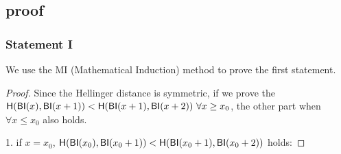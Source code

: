 \subsection{proof}

\subsubsection{Statement I}
We use the MI (Mathematical Induction) method to prove the first statement.

\begin{proof}
Since the Hellinger distance is symmetric, if we prove the $\mathsf{H} (\mathsf{BI}(x), \mathsf{BI}(x + 1)) < \mathsf{H} (\mathsf{BI}(x + 1), \mathsf{BI}(x + 2))\ \forall x \geq x_0$, the other part when $\forall x \leq x_0$ also holds.

1. if $x = x_0$, $\mathsf{H} (\mathsf{BI}(x_0), \mathsf{BI}(x_0 + 1)) < \mathsf{H} (\mathsf{BI}(x_0 + 1), \mathsf{BI}(x_0 + 2))$ holds:



\end{proof}
